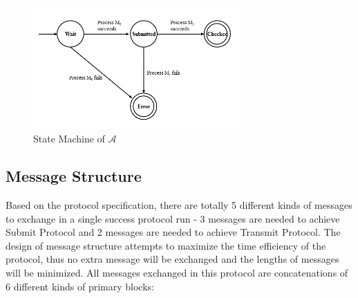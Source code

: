 \begin{figure}[h!]
\centering
\includegraphics[width=0.7\textwidth,natwidth=585,natheight=352]{figures/statemachinefigure.png}
\caption{State Machine of $\mathcal{A}$}
\end{figure}

\subsection{Message Structure}
Based on the protocol specification, there are totally 5 different kinds of messages to exchange in a single success protocol run - 3 messages are needed to achieve Submit Protocol and 2 messages are needed to achieve Transmit Protocol. The design of message structure attempts to maximize the time efficiency of the protocol, thus no extra message will be exchanged and the lengths of messages will be minimized. All messages exchanged in this protocol are concatenations of 6 different kinds of primary blocks:
